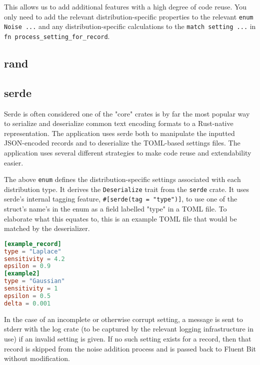 This allows us to add additional features with a high degree of code reuse. You only need to add the relevant distribution-specific properties to the relevant \texttt{enum Noise {...}} and any distribution-specific calculations to the \texttt{match setting {...}} in \texttt{fn process\_setting\_for\_record}. 

\subsection{rand}

\subsection{serde}
Serde is often considered one of the "core" crates is by far the most popular way to serialize and deserialize common text encoding formats to a Rust-native representation. The application uses serde both to manipulate the inputted JSON-encoded records and to deserialize the TOML-based settings files. The application uses several different strategies to make code reuse and extendability easier.


The above \texttt{enum} defines the distribution-specific settings associated with each distribution type. It derives the \texttt{Deserialize} trait from the \texttt{serde} crate. It uses serde's internal tagging feature, \texttt{\#[serde(tag = "type")]}, to use one of the struct's name's in the enum as a field labelled "type" in a TOML file. To elaborate what this equates to, this is an example TOML file that would be matched by the deserializer.
\begin{lstlisting}[language=toml, caption={Example privacy settings}]
[example_record]
type = "Laplace"
sensitivity = 4.2
epsilon = 0.9
[example2]
type = "Gaussian"
sensitivity = 1
epsilon = 0.5
delta = 0.001
\end{lstlisting}
In the case of an incomplete or otherwise corrupt setting, a message is sent to stderr with the log crate (to be captured by the relevant logging infrastructure in use) if an invalid setting is given. If no such setting exists for a record, then that record is skipped from the noise addition process and is passed back to Fluent Bit without modification. 



